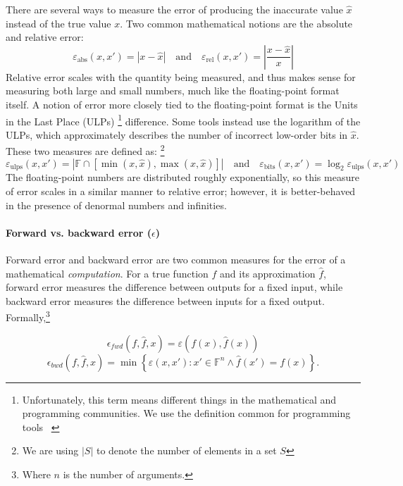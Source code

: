 \documentclass[main.tex]{subfiles}
\begin{document}
There are several ways to measure the error
  of producing the inaccurate value $\hat x$ instead of the true value $x$.
Two common mathematical notions are the absolute and relative error:
\begin{equation*}
  \varepsilon_{\text{abs}}(x, x') = \left|x - \hat x\right|
  \quad \text{and} \quad
  \varepsilon_{\text{rel}}(x, x') = \left|\frac{x - \hat x}{x}\right|
\end{equation*}
Relative error scales with the quantity being measured,
  and thus makes sense for measuring both large and small numbers,
  much like the floating-point format itself.
A notion of error more closely tied to the floating-point format
  is the Units in the Last Place (ULPs)%
\footnote{Unfortunately, this term means different things
  in the mathematical and programming communities.
  We use the definition common for programming tools~%
\cite{stoke-verify,pavel15,stoke-fp}}
 difference.
Some tools instead use the logarithm of the ULPs,
  which approximately describes
  the number of incorrect low-order bits in $\hat x$.
These two measures are defined as:%
\footnote{We are using $|S|$ to denote the number of elements in a set $S$}
\begin{equation*}
\varepsilon_{\text{ulps}}(x, x') = |\mathbb{F} \cap [\min(x, \hat x), \max(x, \hat x)]|
\quad \text{and} \quad
\varepsilon_{\text{bits}}(x, x') = \log_2 \varepsilon_{\text{ulps}}(x, x')
\end{equation*}
The floating-point numbers are distributed roughly exponentially, so
this measure of error scales in a similar manner to relative
error; however, it is better-behaved in the presence of denormal
numbers and infinities.

\paragraph{Forward vs. backward error ($\epsilon$)}

Forward error and backward error are two common measures
  for the error of a mathematical \emph{computation}.
For a true function $f$ and its approximation $\hat f$,
  forward error measures the difference between outputs for a fixed input,
  while backward error measures the difference between inputs
  for a fixed output.
Formally,\footnote{Where $n$ is the number of arguments.}

\begin{equation*}
  \epsilon_{fwd}(f, \hat{f}, x) = \varepsilon(f(x), \hat{f}(x))
\end{equation*}
\begin{equation*}
  \epsilon_{bwd}(f, \hat{f}, x) =
  \min \left\{ \varepsilon(x, x') : x' \in \mathbb{F}^n \land {\hat f}(x') = f(x) \right\}.
\end{equation*}
\end{document}
